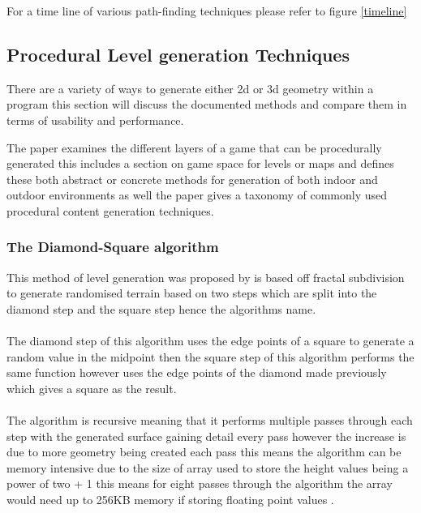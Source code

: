For a time line of various path-finding techniques please refer to figure \ref{timeline}

\subsection{Procedural Level generation Techniques}
There are a variety of ways to generate either 2d or 3d geometry within a program this section will discuss the documented methods and compare them in terms of usability and performance.

The paper \cite{LG-Survey} examines the different layers of a game that can be procedurally generated this includes a section on game space for levels or maps and defines these both abstract or concrete methods for generation of both indoor and outdoor environments as well the paper gives a taxonomy of commonly used procedural content generation techniques.  

\subsubsection{The Diamond-Square algorithm}
This method of level generation was proposed by \cite{DSA2} is based off fractal subdivision to generate randomised terrain based on two steps which are split into the diamond step  and the square step hence the algorithms name.\\\\ The diamond step of this algorithm uses the edge points of a square to generate a random value in the midpoint then the square step of this algorithm performs the same function however uses the edge points of the diamond made previously which gives a square as the result. \\\\The algorithm is recursive meaning that it performs multiple passes through each step with the generated surface gaining detail every pass however the increase is due to more geometry being created each pass this means the algorithm can be memory intensive due to the size of array used to store the height values being a power of two + 1 this means for eight passes through the algorithm the array would need up to 256KB memory if storing floating point values \cite{LevelDSA}.

